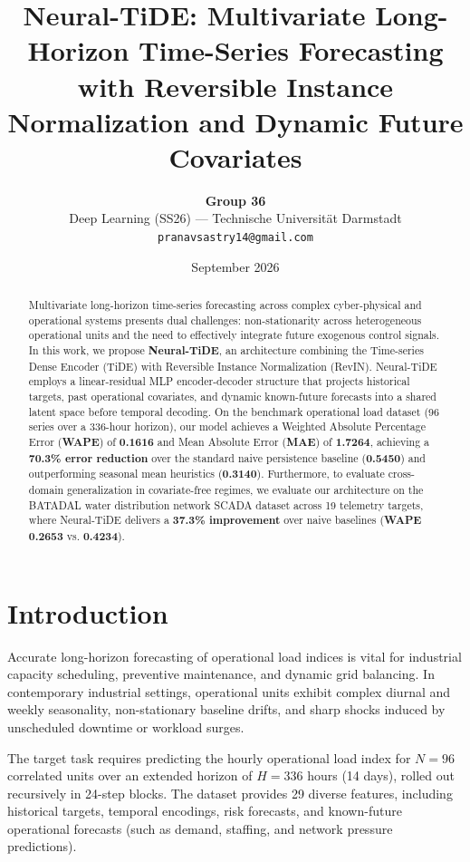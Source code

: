 \documentclass[11pt,a4paper]{article}
\title{\textbf{Neural-TiDE: Multivariate Long-Horizon Time-Series Forecasting with Reversible Instance Normalization and Dynamic Future Covariates}}
\author{
    \textbf{Group 36} \\
    Deep Learning (SS26) --- Technische Universit{\"a}t Darmstadt \\
    \texttt{pranavsastry14@gmail.com}
}
\date{September 2026}
\begin{document}
\maketitle

\begin{abstract}
Multivariate long-horizon time-series forecasting across complex cyber-physical and operational systems presents dual challenges: non-stationarity across heterogeneous operational units and the need to effectively integrate future exogenous control signals. In this work, we propose \textbf{Neural-TiDE}, an architecture combining the Time-series Dense Encoder (TiDE) with Reversible Instance Normalization (RevIN). Neural-TiDE employs a linear-residual MLP encoder-decoder structure that projects historical targets, past operational covariates, and dynamic known-future forecasts into a shared latent space before temporal decoding. On the benchmark operational load dataset (96 series over a 336-hour horizon), our model achieves a Weighted Absolute Percentage Error (\textbf{WAPE}) of \textbf{0.1616} and Mean Absolute Error (\textbf{MAE}) of \textbf{1.7264}, achieving a \textbf{70.3\% error reduction} over the standard naive persistence baseline (\textbf{0.5450}) and outperforming seasonal mean heuristics (\textbf{0.3140}). Furthermore, to evaluate cross-domain generalization in covariate-free regimes, we evaluate our architecture on the BATADAL water distribution network SCADA dataset across 19 telemetry targets, where Neural-TiDE delivers a \textbf{37.3\% improvement} over naive baselines (\textbf{WAPE 0.2653} vs. \textbf{0.4234}).
\end{abstract}

\section{Introduction}
Accurate long-horizon forecasting of operational load indices is vital for industrial capacity scheduling, preventive maintenance, and dynamic grid balancing. In contemporary industrial settings, operational units exhibit complex diurnal and weekly seasonality, non-stationary baseline drifts, and sharp shocks induced by unscheduled downtime or workload surges.

The target task requires predicting the hourly operational load index for $N = 96$ correlated units over an extended horizon of $H = 336$ hours (14 days), rolled out recursively in 24-step blocks. The dataset provides 29 diverse features, including historical targets, temporal encodings, risk forecasts, and known-future operational forecasts (such as demand, staffing, and network pressure predictions).
\end{document}
